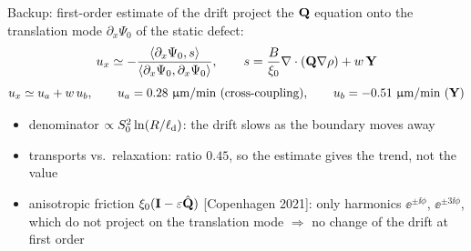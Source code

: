 \documentclass[12pt,aspectratio=169]{beamer}
\providecommand{\Y}{\mathbf{Y}}
\newcommand{\refs}[1]{{\scriptsize\color{softgray}#1}}
\newcommand{\backto}[1]{\hfill\hyperlink{#1}{\beamerreturnbutton{back}}}
\begin{document}
\begin{frame}[t,label=b-estimate]{Backup: first-order estimate of the drift}
\small\setlength{\abovedisplayskip}{3pt}\setlength{\belowdisplayskip}{3pt}
project the $\mathbf{Q}$ equation onto the translation mode $\partial_x\Psi_0$ of the static defect:
\[u_x\simeq-\frac{\la\partial_x\Psi_0,s\ra}{\la\partial_x\Psi_0,\partial_x\Psi_0\ra},\qquad
s=\frac{B}{\xi_0}\nabla\cdot(\Q\nabla\rho)+w\,\Y\]
\[u_x\simeq u_a+w\,u_b,\qquad u_a=0.28~\micron/\minute\ \text{(cross-coupling)},\qquad u_b=-0.51~\micron/\minute\ (\Y)\]
\par\raggedright
\begin{itemize}\setlength{\itemsep}{0.8ex}
\item denominator $\propto S_0^2\ln(R/\ell_{\rm d})$: the drift slows as the boundary moves away
\item transports vs.\ relaxation: ratio $0.45$, so the estimate gives the trend, not the value
\item anisotropic friction $\xi_0(\mathbf{I}-\varepsilon\hat{\mathbf{Q}})$ \refs{[Copenhagen 2021]}: only harmonics $\ee^{\pm\ii\phi}$, $\ee^{\pm3\ii\phi}$,\\ which do not project on the translation mode $\Rightarrow$ no change of the drift at first order
\end{itemize}
\backto{m-reverse}
\end{frame}
\end{document}
